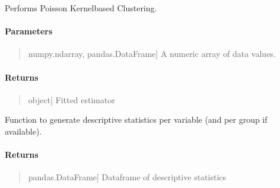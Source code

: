 \documentclass[letterpaper,10pt,english,openany,oneside]{sphinxmanual}
\begin{document}
\begin{fulllineitems}
\label{\detokenize{api_reference/generated/QuadratiK.spherical_clustering.PKBC:QuadratiK.spherical_clustering.PKBC.fit}}
\pysigstartsignatures
{}
\pysigstopsignatures
\sphinxAtStartPar
Performs Poisson Kernel\sphinxhyphen{}based Clustering.


\paragraph{Parameters}
\label{\detokenize{api_reference/generated/QuadratiK.spherical_clustering.PKBC:id1}}\begin{quote}
\begin{description}
\sphinxlineitem{dat}{[}numpy.ndarray, pandas.DataFrame{]}
\sphinxAtStartPar
A numeric array of data values.

\end{description}
\end{quote}


\paragraph{Returns}
\label{\detokenize{api_reference/generated/QuadratiK.spherical_clustering.PKBC:returns}}\begin{quote}
\begin{description}
\sphinxlineitem{self}{[}object{]}
\sphinxAtStartPar
Fitted estimator

\end{description}
\end{quote}

\end{fulllineitems}


\begin{fulllineitems}
\label{\detokenize{api_reference/generated/QuadratiK.spherical_clustering.PKBC:QuadratiK.spherical_clustering.PKBC.stats}}
\pysigstartsignatures
{}
\pysigstopsignatures
\sphinxAtStartPar
Function to generate descriptive statistics per variable (and per group if available).


\paragraph{Returns}
\label{\detokenize{api_reference/generated/QuadratiK.spherical_clustering.PKBC:id2}}\begin{quote}
\begin{description}
\sphinxlineitem{summary\_stats\_df}{[}pandas.DataFrame{]}
\sphinxAtStartPar
Dataframe of descriptive statistics

\end{description}
\end{quote}

\end{fulllineitems}
\end{document}

